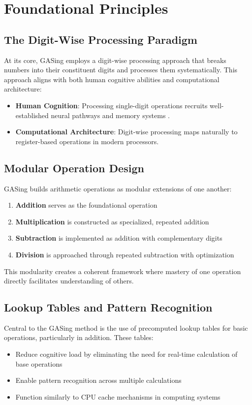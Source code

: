 \section{Foundational Principles}\label{sec:background}

\subsection{The Digit-Wise Processing Paradigm}

At its core, GASing employs a digit-wise processing approach that breaks numbers into their constituent digits and processes them systematically. This approach aligns with both human cognitive abilities and computational architecture:

\begin{itemize}
    \item \textbf{Human Cognition}: Processing single-digit operations recruits well-established neural pathways and memory systems \cite{dehaene2011}.
    \item \textbf{Computational Architecture}: Digit-wise processing maps naturally to register-based operations in modern processors.
\end{itemize}

\subsection{Modular Operation Design}

GASing builds arithmetic operations as modular extensions of one another:

\begin{enumerate}
    \item \textbf{Addition} serves as the foundational operation
    \item \textbf{Multiplication} is constructed as specialized, repeated addition
    \item \textbf{Subtraction} is implemented as addition with complementary digits
    \item \textbf{Division} is approached through repeated subtraction with optimization
\end{enumerate}

This modularity creates a coherent framework where mastery of one operation directly facilitates understanding of others.

\subsection{Lookup Tables and Pattern Recognition}

Central to the GASing method is the use of precomputed lookup tables for basic operations, particularly in addition. These tables:

\begin{itemize}
    \item Reduce cognitive load by eliminating the need for real-time calculation of base operations
    \item Enable pattern recognition across multiple calculations
    \item Function similarly to CPU cache mechanisms in computing systems
\end{itemize}

